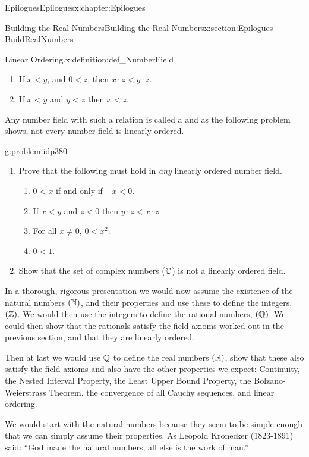 \begin{chapterptx}{Epilogues}{}{Epilogues}{}{}{x:chapter:Epilogues}
\begin{sectionptx}{Building the Real Numbers}{}{Building the Real Numbers}{}{}{x:section:Epilogues-BuildRealNumbers}
\begin{introduction}{}
\begin{definition}{Linear Ordering.}{x:definition:def_NumberField}
\begin{enumerate}
					\item{}If \(x\lt y\), and \(0\lt z\), then \(x\cdot z \lt y\cdot z\).%
					\item{}If \(x\lt y\) and \(y\lt z\) then \(x\lt z\).%
				\end{enumerate}
			\end{definition}
			Any number field with such a relation is called a  and as the following problem shows, not every number field is linearly ordered.%
			\begin{problem}{}{g:problem:idp380}%
				\begin{enumerate}[font=\bfseries,label=(\alph*),ref=\alph*]
					\item{}Prove that the following must hold in \emph{any} linearly ordered number field.%
					\par
					\begin{enumerate}
						\item{}\(0\lt x\) if and only if \(-x\lt 0\).%
						\item{}If \(x\lt y\) and \(z\lt 0\) then \(y\cdot z\lt x\cdot z\).%
						\item{}For all \(x\neq 0\), \(0\lt x^2\).%
						\item{}\(0\lt 1\).%
					\end{enumerate}
					\item{}Show that the set of complex numbers (\(\mathbb {C}\)) is not a linearly ordered field.%
				\end{enumerate}
			\end{problem}
			In a thorough, rigorous presentation we would now assume the existence of the natural numbers \((\mathbb {N})\), and their properties and use these to define the integers, \((\mathbb {Z})\). We would then use the integers to define the rational numbers, \((\mathbb {Q})\). We could then show that the rationals satisfy the field axioms worked out in the previous section, and that they are linearly ordered.%
			\par
			Then \textemdash{} at last \textemdash{} we would use \(\mathbb {Q}\) to define the real numbers \((\mathbb {R})\), show that these also satisfy the field axioms and also have the other properties we expect: Continuity, the Nested Interval Property, the Least Upper Bound Property, the Bolzano-Weierstrass Theorem, the convergence of all Cauchy sequences, and linear ordering.%
			\par
			We would start with the natural numbers because they seem to be simple enough that we can simply assume their properties. As Leopold Kronecker (1823-1891) said: ``God made the natural numbers, all else is the work of man.''%

\end{introduction}
\end{sectionptx}
\end{chapterptx}
